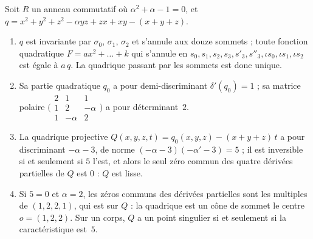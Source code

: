 \begin{encadre}
\begin{exemple}
Soit $R$ un anneau commutatif où $\alpha^2 + \alpha - 1 = 0$, et $q = x^2 + y^2 + z^2 - \alpha yz + zx + xy - (x + y + z)$.
\begin{enumerate}
\item $q$ est invariante par $\sigma_0$, $\sigma_1$, $\sigma_2$ et s'annule aux douze sommets ; toute fonction quadratique $F = a x^2 + \dots + k$ qui s'annule en $s_0, s_1, s_2, s_3, s'_3, s''_3, \iota s_0, \iota s_1, \iota s_2$ est égale à $a\,q$. La quadrique passant par les sommets est donc unique.
\item Sa partie quadratique $q_0$ a pour demi-discriminant $\delta'(q_0) = 1$ ; sa matrice polaire $\bigl(\begin{smallmatrix} 2 & 1 & 1 \\ 1 & 2 & -\alpha \\ 1 & -\alpha & 2 \end{smallmatrix}\bigr)$ a pour déterminant~$2$.
\item La quadrique projective $Q(x, y, z, t) = q_0(x, y, z) - (x + y + z)\,t$ a pour discriminant $-\alpha - 3$, de norme $(-\alpha - 3)(-\alpha' - 3) = 5$ ; il est inversible si et seulement si $5$ l'est, et alors le seul zéro commun des quatre dérivées partielles de $Q$ est $0$ : $Q$ est lisse.
\item Si $5 = 0$ et $\alpha = 2$, les zéros communs des dérivées partielles sont les multiples de $(1, 2, 2, 1)$, qui est sur $Q$ : la quadrique est un cône de sommet le centre $o = (1, 2, 2)$. Sur un corps, $Q$ a un point singulier si et seulement si la caractéristique est~$5$.
\end{enumerate}
\end{exemple}
\end{encadre}

